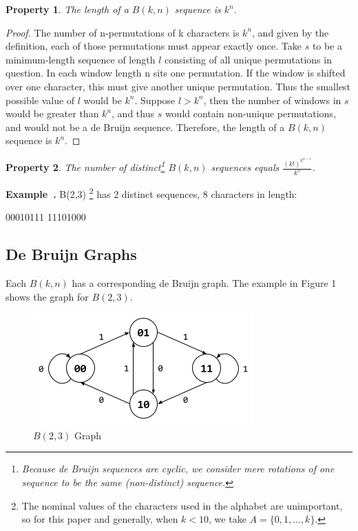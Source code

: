 \documentclass[12pt]{article}
\newtheorem{property}{Property}[section]
\newcounter{example}[section]
\newenvironment{example}[1][]{\refstepcounter{example}\par\medskip
   \noindent \textbf{Example~\theexample. #1} \rmfamily}{\medskip}
\begin{document}
\begin{property}
\normalfont The length of a $B(k,n)$ sequence is $k^n$.
\end{property}
\begin{proof}
The number of n-permutations of k characters is $k^{n}$, and given by the definition, each of those permutations must appear exactly once. Take $s$ to be a minimum-length sequence of length $l$ consisting of all unique permutations in question. In each window length n sits one permutation. If the window is shifted over one character, this must give another unique permutation. Thus the smallest possible value of $l$ would be $k^{n}$. Suppose $l > k^{n}$, then the number of windows in $s$ would be greater than $k^{n}$, and thus $s$ would contain non-unique permutations, and would not be a de Bruijn sequence. Therefore, the length of a $B(k,n)$ sequence is $k^n$.
\end{proof}

\begin{property}
\normalfont The number of distinct\footnote{Because de Bruijn sequences are cyclic, we consider mere rotations of one sequence to be the same (non-distinct) sequence.} $B(k,n)$ sequences equals $\frac{(k!)^{k^{n-1}}}{k^{n}}$.
\end{property}

\begin{example}
B(2,3) \footnote{The nominal values of the characters used in the alphabet are unimportant, so for this paper and generally, when $k<10$, we take $A=\lbrace0,1,\dots,k\rbrace$.} has 2 distinct sequences, 8 characters in length:\newline 
\centerline{00010111 \hspace{5 mm} 11101000 }
\end{example}

\subsection{De Bruijn Graphs}
Each $B(k,n)$ has a corresponding de Bruijn graph. The example in Figure 1 shows the graph for $B(2,3)$.

\begin{figure}[ht!]
\centering
\includegraphics[scale=0.75]{graphics/b23_graph.png}
\caption{$B(2,3)$ Graph}
\label{fig:$B(2,3)$ Graph}
\end{figure}
\end{document}
